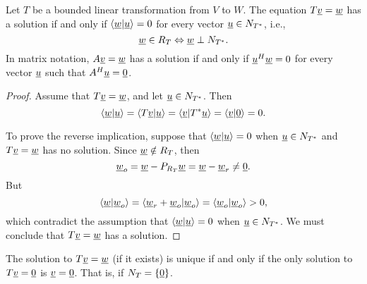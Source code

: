 \begin{theorem}
Let $T$ be a bounded linear transformation from $V$ to $W$.
The equation $T\underline{v} = \underline{w}$ has a solution if and only if $\left\langle \underline{w} | \underline{u} \right\rangle = 0$ for every vector $\underline{u} \in N_{T^*}$, i.e.,
\begin{equation*}
\underline{w} \in R_T \Leftrightarrow \underline{w} \perp N_{T^*} .
\end{equation*}
In matrix notation, $A \underline{v} = \underline{w}$ has a solution if and only if $\underline{u}^H \underline{w} = 0$ for every vector $\underline{u}$ such that $A^H \underline{u} = \underline{0}$.
\end{theorem}
\begin{proof}
Assume that $T \underline{v} = \underline{w}$, and let $\underline{u} \in N_{T^*}$.
Then
\begin{equation*}
\left\langle \underline{w} | \underline{u} \right\rangle
= \left\langle T \underline{v} | \underline{u} \right\rangle
= \left\langle \underline{v} | T^* \underline{u} \right\rangle
= \left\langle \underline{v} | \underline{0} \right\rangle
= 0 .
\end{equation*}

To prove the reverse implication, suppose that $\left\langle \underline{w} | \underline{u} \right\rangle = 0$ when $\underline{u} \in N_{T^*}$ and $T \underline{v} = \underline{w}$ has no solution.
Since $\underline{w} \notin R_T$, then
\begin{equation*}
\underline{w}_o = \underline{w} - P_{R_T} \underline{w} = \underline{w} - \underline{w}_r
\neq \underline{0}.
\end{equation*}
But
\begin{equation*}
\left\langle \underline{w} | \underline{w}_o \right\rangle
= \left\langle \underline{w}_r + \underline{w}_o  | \underline{w}_o \right\rangle
= \left\langle \underline{w}_o | \underline{w}_o \right\rangle
> 0,
\end{equation*}
which contradict the assumption that $\left\langle \underline{w} | \underline{u} \right\rangle = 0$ when $\underline{u} \in N_{T^*}$.
We must conclude that $T \underline{v} = \underline{w}$ has a solution.
\end{proof}

\begin{fact}
The solution to $T \underline{v} = \underline{w}$ (if it exists) is unique if and only if the only solution to $T \underline{v} = \underline{0}$ is $\underline{v} = \underline{0}$.
That is, if $N_T = \left\{ \underline{0} \right\}$.
\end{fact}

